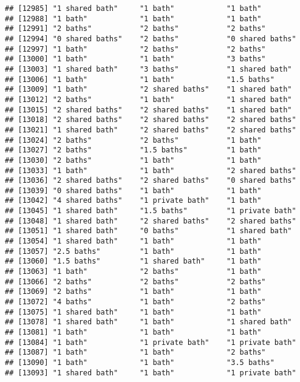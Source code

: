 \documentclass[
]{article}
\begin{document}
\begin{verbatim}
## [12985] "1 shared bath"     "1 bath"            "1 bath"           
## [12988] "1 bath"            "1 bath"            "1 bath"           
## [12991] "2 baths"           "2 baths"           "2 baths"          
## [12994] "0 shared baths"    "2 baths"           "0 shared baths"   
## [12997] "1 bath"            "2 baths"           "2 baths"          
## [13000] "1 bath"            "1 bath"            "3 baths"          
## [13003] "1 shared bath"     "3 baths"           "1 shared bath"    
## [13006] "1 bath"            "1 bath"            "1.5 baths"        
## [13009] "1 bath"            "2 shared baths"    "1 shared bath"    
## [13012] "2 baths"           "1 bath"            "1 shared bath"    
## [13015] "2 shared baths"    "2 shared baths"    "1 shared bath"    
## [13018] "2 shared baths"    "2 shared baths"    "2 shared baths"   
## [13021] "1 shared bath"     "2 shared baths"    "2 shared baths"   
## [13024] "2 baths"           "2 baths"           "1 bath"           
## [13027] "2 baths"           "1.5 baths"         "1 bath"           
## [13030] "2 baths"           "1 bath"            "1 bath"           
## [13033] "1 bath"            "1 bath"            "2 shared baths"   
## [13036] "2 shared baths"    "2 shared baths"    "0 shared baths"   
## [13039] "0 shared baths"    "1 bath"            "1 bath"           
## [13042] "4 shared baths"    "1 private bath"    "1 bath"           
## [13045] "1 shared bath"     "1.5 baths"         "1 private bath"   
## [13048] "1 shared bath"     "2 shared baths"    "2 shared baths"   
## [13051] "1 shared bath"     "0 baths"           "1 shared bath"    
## [13054] "1 shared bath"     "1 bath"            "1 bath"           
## [13057] "2.5 baths"         "1 bath"            "1 bath"           
## [13060] "1.5 baths"         "1 shared bath"     "1 bath"           
## [13063] "1 bath"            "2 baths"           "1 bath"           
## [13066] "2 baths"           "2 baths"           "2 baths"          
## [13069] "2 baths"           "1 bath"            "1 bath"           
## [13072] "4 baths"           "1 bath"            "2 baths"          
## [13075] "1 shared bath"     "1 bath"            "1 bath"           
## [13078] "1 shared bath"     "1 bath"            "1 shared bath"    
## [13081] "1 bath"            "1 bath"            "1 bath"           
## [13084] "1 bath"            "1 private bath"    "1 private bath"   
## [13087] "1 bath"            "1 bath"            "2 baths"          
## [13090] "1 bath"            "1 bath"            "3.5 baths"        
## [13093] "1 shared bath"     "1 bath"            "1 private bath"   

\end{verbatim}
\end{document}
